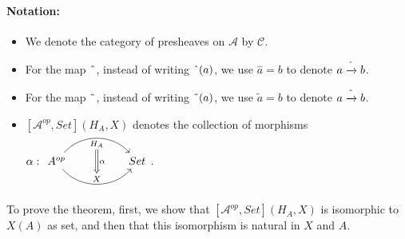 \documentclass[18pt,a4paper]{article}
\theoremstyle{definition}
\begin{document}
\paragraph{Notation:} \begin{itemize}
	\item We denote the category of presheaves on $\mathcal{A}$ by $\mathcal{C}$.
	\item For the map $\string ^$, instead of writing $\string ^ (a)$,
		we use $\hat{a} = b$ to denote $a \xrightarrow{ \string ^ } b$.

	\item For the map $\string ~$, instead of writing $\string ~ (a)$,
		we use $\tilde{a} = b$ to denote $a \xrightarrow{ \string ~ } b$.
	\item $[ \mathcal{A}^{op},Set](	H_A,X) $ denotes the collection of morphisms $\alpha: \begin{tikzcd}[row sep=large, column sep=huge]
				A^{op} \arrow[r,bend left=50, "H_A"{name=U, below}]
					\arrow[r, bend right = 50, "X"{name=D, above}]
					& Set
					\arrow[Rightarrow, from=U , to=D, "\alpha"]
		\end{tikzcd}$.
\end{itemize}
To prove the theorem,
first, we show that $[ \mathcal{A} ^{op}, Set](H_A,X)$ is isomorphic to $X(A) $ as set,
and then that this isomorphism is natural in $X$ and $A$.
\end{document}
